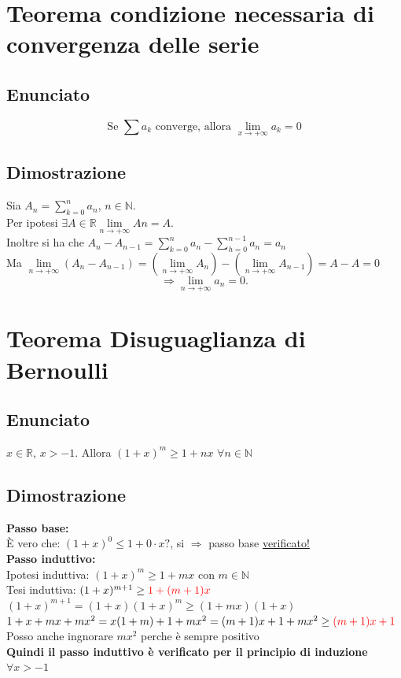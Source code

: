 \documentclass{article}
\newcommand{\R}{\mathbb{R}}
\newcommand{\N}{\mathbb{N}}
\newcommand{\vSpace}{\vspace{1em}}
\begin{document}
\begin{flushleft}
\section{Teorema condizione necessaria di convergenza delle serie}
\subsection{Enunciato}
\[
\text{Se } \sum a_k \text{ converge, allora } \lim\limits_{x \to + \infty}a_k = 0
\]

\subsection{Dimostrazione}
Sia $A_n = \sum\limits_{k = 0}^{n}a_n$, $n \in \N$.\\
Per ipotesi $\exists A \in \R \lim\limits_{n \to + \infty} An = A$. \\
Inoltre si ha che $A_n - A_{n-1} = \sum\limits_{k = 0}^{n}a_n - \sum\limits_{h = 0}^{n-1}a_n = a_n$
\\Ma $\lim\limits_{n \to + \infty}(A_n - A_{n-1}) = (\lim\limits_{n \to + \infty}A_n) - (\lim\limits_{n \to + \infty}A_{n-1}) = A - A = 0$
\[
\Rightarrow \lim\limits_{n \to + \infty}a_n = 0\text{.}
\]

\section{Teorema Disuguaglianza di Bernoulli}
\subsection{Enunciato}
$x \in \R$, $x > - 1$. Allora $(1+x)^m \geq 1 + nx$ $\forall n \in \N$

\subsection{Dimostrazione}
\textbf{Passo base:}\\
È vero che: $(1+x)^0 \leq 1 + 0 \cdot x?$, si $\Rightarrow$ passo base \underline{verificato!}
\\\vSpace
\textbf{Passo induttivo:}\\
Ipotesi induttiva: $(1+x)^m \geq 1 + mx$ \hspace*{1em} con $m \in \N$\\
Tesi induttiva: $(1+x)^{m+1} \geq \textcolor{red}{1 + (m+1)x}$
\\\vSpace
$(1+x)^{m + 1} = (1+x)(1+x)^m \geq (1 + mx)(1+x)$\\
$1 + x + mx + mx^2 = x(1+m)+ 1 + mx^2 = (m+1)x + 1 + mx^2 \geq \textcolor{red}{(m+1)x + 1}$ \hspace*{1em}Posso anche ingnorare $mx^2$ perche è sempre positivo
\\\vSpace
\textbf{Quindi il passo induttivo è verificato per il principio di induzione $\forall x > -1$}


\end{flushleft}
\end{document}
